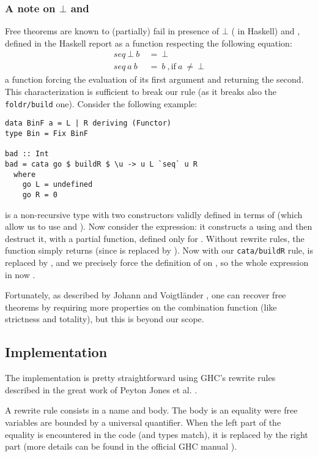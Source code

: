 \subsubsection{A note on $\bot$ and }
\label{sec:seq}
Free theorems are known to (partially) fail in presence of $\bot$ ( in Haskell) and , defined in the Haskell report \cite{haskellReport} as a function respecting the following equation:
\begin{align*}
seq\ \bot\ b\ &=\ \bot\\
seq\ a\ b\ &=\ b\ \mathrm{,if}\ a\ \neq\ \bot
\end{align*}
 a function forcing the evaluation of its first argument and returning the second. This characterization is sufficient to break our rule (as it breaks also the \verb|foldr/build| one). Consider the following example:

\begin{verbatim}
data BinF a = L | R deriving (Functor)
type Bin = Fix BinF

bad :: Int
bad = cata go $ buildR $ \u -> u L `seq` u R
  where
    go L = undefined
    go R = 0
\end{verbatim}
 is a non-recursive type with two constructors validly defined in terms of  (which allow us to use  and ). Now consider the  expression: it constructs a  using  and then destruct it, with a partial function, defined only for . Without rewrite rules, the function simply returns  (since  is replaced by ). Now with our \verb|cata/buildR| rule,  is replaced by , and we precisely force the definition of  on , so the whole expression in now .

Fortunately, as described by Johann and Voigtländer \cite{JV04}, one can recover free theorems by requiring more properties on the combination function (like strictness and totality), but this is beyond our scope.

\subsection{Implementation}
The implementation is pretty straightforward using GHC's rewrite rules described in the great work of Peyton Jones et al. \cite{pbr}.

A rewrite rule consists in a name and body. The body is an equality were free variables are bounded by a universal quantifier. When the left part of the equality is encountered in the code (and types match), it is replaced by the right part (more details can be found in the official GHC manual \cite{ghc:manual}).

